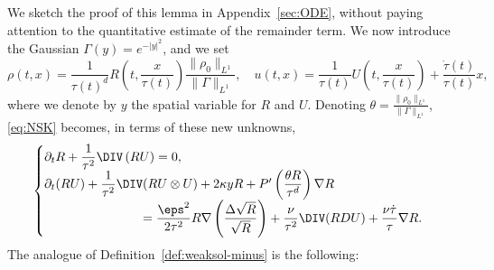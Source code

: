 We sketch the proof of this lemma in Appendix~\ref{sec:ODE}, without paying attention to the quantitative estimate of the remainder term. We now introduce the Gaussian $\Gamma(y)=e^{-|y|^2}$, and we set
\begin{equation}\label{eq:uvFluid}
\rho(t,x) =
\frac{1}{\tau(t)^d}R\left(t,\frac{x}{\tau(t)}\right)
\frac{\|\rho_0\|_{L^1}}{\|\Gamma\|_{L^1}},\quad u(t,x) = \frac{1}{\tau(t)} U \left(t,\frac{x}{\tau(t)}\right) +\frac{\dot \tau(t)}{\tau(t)}x,
\end{equation}
where we denote by $y$ the spatial variable for $R$ and $U$. Denoting $\theta=\frac{\| \rho_0 \|_{L^1}}{\|\Gamma\|_{L^1}}$, \eqref{eq:NSK} becomes, in terms of these new unknowns,
\begin{equation}\label{eq:RU}
\begin{cases}
\partial_tR+\dfrac{1}{\tau^2}\DIV\left(R U\right)=0,\\
\partial_t (R U) +\dfrac{1}{\tau^2}\DIV (R U \otimes U) +2\kappa y R +P'\left(\dfrac{\theta R}{\tau^d}\right) \nabla R \\
\mkern 140mu =\dfrac{\eps^2}{2\tau^2}R\nabla\left(\dfrac{\Delta \sqrt{R}}{\sqrt{R}}\right) +\dfrac{\nu}{\tau^2} \DIV (R DU) + \dfrac{\nu \dot \tau}{\tau} \nabla R.
\end{cases}
\end{equation}
The analogue of Definition~\ref{def:weaksol-minus} is the following:


